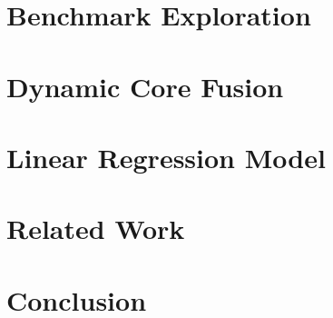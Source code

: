 \documentclass[format=acmsmall, review=false, screen=true]{acmart}
\begin{document}
\vspace{5mm}
\section{Benchmark Exploration}\label{sec:expl}


\section{Dynamic Core Fusion}\label{sec:dynamic}



\section{Linear Regression Model}\label{sec:model}


\section{Related Work}\label{sec:related}


\section{Conclusion}\label{sec:conc}



 
\end{document}
